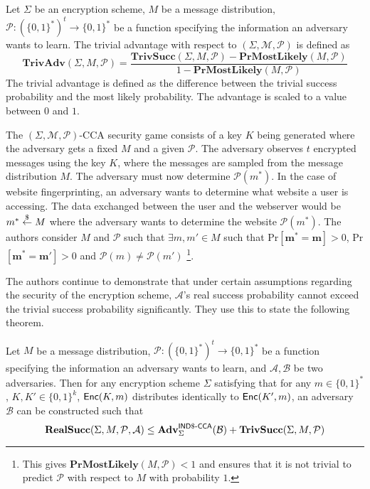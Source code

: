 \begin{definition}
\label{trivadv}
Let $\Sigma$ be an encryption scheme, $M$ be a message distribution, $\mathcal{P}: (\{0,1\}^{*})^{t} \rightarrow \{0,1\}^{*}$ be a function specifying the information an adversary wants to learn. The trivial advantage with respect to $(\Sigma,\mathcal{M},\mathcal{P})$ is defined as
\[ \mathbf{TrivAdv}(\Sigma,M,\mathcal{P}) = \frac{\mathbf{TrivSucc}(\Sigma,M,\mathcal{P}) - \mathbf{PrMostLikely}(M,\mathcal{P})}{1 - \mathbf{PrMostLikely}(M,\mathcal{P})} \]
The trivial advantage is defined as the difference between the trivial success probability and the most likely probability. The advantage is scaled to a value between $0$ and $1$.
\end{definition}

The $(\Sigma,\mathcal{M},\mathcal{P})\text{-CCA}$ security game consists of a key $K$ being generated where the adversary gets a fixed $M$ and a given $\mathcal{P}$. The adversary observes $t$ encrypted messages using the key $K$, where the messages are sampled from the message distribution $M$. The adversary must now determine $\mathcal{P}(m^{*})$. In the case of website fingerprinting, an adversary wants to determine what website a user is accessing. The data exchanged between the user and the webserver would be $m^{*} \overset{\$}{\leftarrow} M$ where the adversary wants to determine the website $\mathcal{P}(m^{*})$. The authors consider $M$ and $\mathcal{P}$ such that $\exists m, m' \in M$ such that Pr$[ \mathbf{m^*} = \mathbf{m} ] > 0$, Pr$[ \mathbf{m^*} = \mathbf{m'} ] > 0$ and $\mathcal{P}(m) \neq \mathcal{P}(m')$ \footnote{This gives $\mathbf{PrMostLikely}(M,\mathcal{P}) < 1$ and ensures that it is not trivial to predict $\mathcal{P}$ with respect to $M$ with probability $1$.}.

The authors \cite{DBLP:conf/ctrsa/GellertJLN22} continue to demonstrate that under certain assumptions regarding the security of the encryption scheme, $\mathcal{A}$'s real success probability cannot exceed the trivial success probability significantly. They use this to state the following theorem.
\begin{theorem}
\label{theorem1}
Let $M$ be a message distribution, $\mathcal{P}: (\{0,1\}^{*})^{t} \rightarrow \{0,1\}^{*}$ be a function specifying the information an adversary wants to learn, and $\mathcal{A}, \mathcal{B}$ be two adversaries. Then for any encryption scheme $\Sigma$ satisfying that for any $m \in \{0,1\}^{*}$, $K,K' \in \{0,1\}^{k}$, $\mathsf{Enc}(K,m)$ distributes identically to $\mathsf{Enc}(K',m)$, an adversary $\mathcal{B}$ can be constructed such that
\[ \mathbf{RealSucc} (\Sigma,M,\mathcal{P},\mathcal{A}) \leq \mathbf{Adv}_{\Sigma}^{\operatorname{\mathsf{IND\$-CCA}}}(\mathcal{B}) + \mathbf{TrivSucc} (\Sigma,M,\mathcal{P}) \]
\end{theorem}

